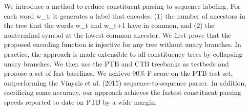 We introduce a method to reduce constituent parsing to sequence labeling. For each word w\_t, it generates a label that encodes: (1) the number of ancestors in the tree that the words w\_t and w\_{t+1} have in common, and (2) the nonterminal symbol at the lowest common ancestor. We first prove that the proposed encoding function is injective for any tree without unary branches. In practice, the approach is made extensible to all constituency trees by collapsing unary branches. We then use the PTB and CTB treebanks as testbeds and propose a set of fast baselines. We achieve 90\% F-score on the PTB test set, outperforming the Vinyals et al. (2015) sequence-to-sequence parser. In addition, sacrificing some accuracy, our approach achieves the fastest constituent parsing speeds reported to date on PTB by a wide margin.
